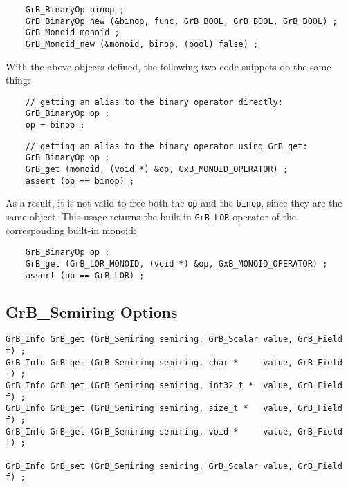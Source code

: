     {\footnotesize
    \begin{verbatim}
    GrB_BinaryOp binop ;
    GrB_BinaryOp_new (&binop, func, GrB_BOOL, GrB_BOOL, GrB_BOOL) ;
    GrB_Monoid monoid ;
    GrB_Monoid_new (&monoid, binop, (bool) false) ; \end{verbatim} }

With the above objects defined, the following two code snippets do the same thing:

    {\footnotesize
    \begin{verbatim}
    // getting an alias to the binary operator directly:
    GrB_BinaryOp op ;
    op = binop ; \end{verbatim} }

    {\footnotesize
    \begin{verbatim}
    // getting an alias to the binary operator using GrB_get:
    GrB_BinaryOp op ;
    GrB_get (monoid, (void *) &op, GxB_MONOID_OPERATOR) ;
    assert (op == binop) ; \end{verbatim} }

As a result, it is not valid to free both the \verb'op' and the \verb'binop',
since they are the same object.  This usage returns the built-in \verb'GrB_LOR'
operator of the corresponding built-in monoid:

    {\footnotesize
    \begin{verbatim}
    GrB_BinaryOp op ;
    GrB_get (GrB_LOR_MONOID, (void *) &op, GxB_MONOID_OPERATOR) ;
    assert (op == GrB_LOR) ; \end{verbatim} }

\newpage
\subsection{{\sf GrB\_Semiring} Options}
\label{get_set_semiring}

\begin{mdframed}[userdefinedwidth=6in]
{\footnotesize
\begin{verbatim}
GrB_Info GrB_get (GrB_Semiring semiring, GrB_Scalar value, GrB_Field f) ;
GrB_Info GrB_get (GrB_Semiring semiring, char *     value, GrB_Field f) ;
GrB_Info GrB_get (GrB_Semiring semiring, int32_t *  value, GrB_Field f) ;
GrB_Info GrB_get (GrB_Semiring semiring, size_t *   value, GrB_Field f) ;
GrB_Info GrB_get (GrB_Semiring semiring, void *     value, GrB_Field f) ;

GrB_Info GrB_set (GrB_Semiring semiring, GrB_Scalar value, GrB_Field f) ;
\end{verbatim}
}\end{mdframed}

